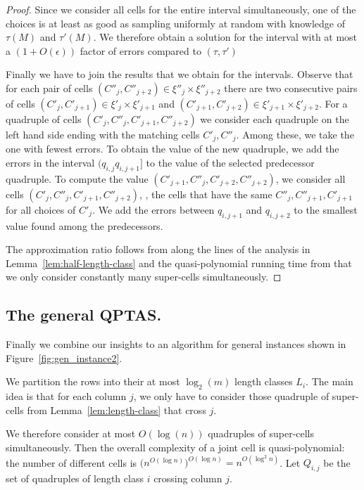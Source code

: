 \begin{proof}
    Since we consider all cells for the entire interval simultaneously, one of the choices is at least as good as sampling uniformly at random with knowledge of $\tau(M)$ and $\tau'(M)$.
    We therefore obtain a solution for the interval with at most a $(1+O(\epsilon))$ factor of errors compared to $(\tau,\tau')$

    Finally we have to join the results that we obtain for the intervals.
    Observe that for each pair of cells $(C''_j,C''_{j+2}) \in \xi''_j \times \xi''_{j+2}$ there are two consecutive pairs of cells
    $(C'_j,C'_{j+1}) \in \xi'_j \times \xi'_{j+1}$ and $(C'_{j+1}, C'_{j+2}) \in \xi'_{j+1} \times \xi'_{j+2}$.
    For a quadruple of cells $(C'_j,C''_j,C'_{j+1},C''_{j+2})$ we consider each quadruple on the left hand side ending with the matching cells $C'_j,C''_j$.
    Among these, we take the one with fewest errors.
    To obtain the value of the new quadruple, we add the errors in the interval $(q_{i,j} q_{i,j+1}]$ to the value of the selected predecessor quadruple.
    To compute the value $(C'_{j+1},C''_j,C'_{j+2},C''_{j+2})$, we consider all cells $(C'_j,C''_j,C'_{j+1},C''_{j+2})$, \ie, the cells that have the same $C''_{j},C''_{j+1},C'_{j+1}$ for all choices of $C'_j$.
    We add the errors between $q_{i,j+1}$ and $q_{i,j+2}$ to the smallest value found among the predecessors.
    
    The approximation ratio follows from along the lines of the analysis in Lemma~\ref{lem:half-length-class} and the quasi-polynomial running time from that we only consider constantly many super-cells simultaneously.

\end{proof}

\subsection{The general QPTAS.}\label{sec:generalQPTAS}
Finally we combine our insights to an algorithm for general instances shown in Figure~\ref{fig:gen_instance2}.

We partition the rows into their at most $\log_2(m)$ length classes $L_i$.
The main idea is that for each column $j$, we only have to consider those quadruple of super-cells from Lemma~\ref{lem:length-class} that cross $j$.

We therefore consider at most $O(\log(n))$ quadruples of super-cells simultaneously.
Then the overall complexity of a joint cell is quasi-polynomial: the number of different cells is $\bigl(n^{O(\log n)}\bigr)^{O(\log n)} = n^{O(\log^2 n)}$.
Let $Q_{i,j}$ be the set of quadruples of length class $i$ crossing column $j$.

